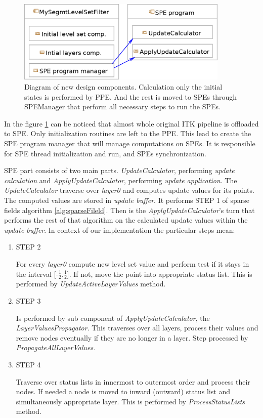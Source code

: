 \begin{figure}
    \centering
    \includegraphics[width=0.9\textwidth]{data/newDesign}
    \caption[Diagram of new design components]
{
Diagram of new design components. Calculation only the initial states is performed by PPE.
And the rest is moved to SPEs through SPEManager that perform all necessary steps to run the SPEs.
}
\label{fg:newDesign}
\end{figure}

In the figure \ref{fg:newDesign} can be noticed that almost whole original ITK pipeline is offloaded to SPE.
Only initialization routines are left to the PPE.
This lead to create the SPE program manager that will manage computations on SPEs.
It is responsible for SPE thread initialization and run, and SPEs synchronization.

SPE part consists of two main parts.
\mbox{\emph{UpdateCalculator}}, performing \emph{update calculation} and \mbox{\emph{ApplyUpdateCalculator}}, performing \emph{update application}.
The \mbox{\emph{UpdateCalculator}} traverse over \emph{layer0} and computes update values for its points.
The computed values are stored in \emph{update buffer}.
It performs STEP 1 of sparse fields algorithm \ref{alg:sparseFileld}.
Then is the \mbox{\emph{ApplyUpdateCalculator}}'s turn that performs the rest of that algorithm on the calculated update values within the \emph{update buffer}.
In context of our implementation the particular steps mean:
\begin{enumerate}
\item STEP 2
\par
For every \emph{layer0} compute new level set value and perform test if it stays in the interval [-$\frac{1}{2}$,$\frac{1}{2}$].
If not, move the point into appropriate status list.
This is performed by \mbox{\emph{UpdateActiveLayerValues}} method.

\item STEP 3
\par
Is performed by sub component of \mbox{\emph{ApplyUpdateCalculator}}, the \mbox{\emph{LayerValuesPropagator}}.
This traverses over all layers, process their values and remove nodes eventually if they are no longer in a layer.
Step processed by \mbox{\emph{PropagateAllLayerValues}}.

\item STEP 4
\par
Traverse over status lists in innermost to outermost order and process their nodes.
If needed a node is moved to inward (outward) status list and simultaneously appropriate layer.
This is performed by \mbox{\emph{ProcessStatusLists}} method.
\end{enumerate}

